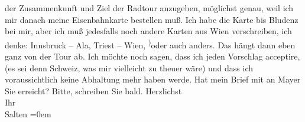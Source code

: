 \begin{ledgroupsized}[t]{13cm}
               der Zusammenkunft und Ziel der Radtour anzugeben, möglichst genau, weil ich mir
               danach meine Eisenbahnkarte bestellen muß. Ich habe die Karte bis Bludenz bei mir, aber ich muß jedesfalls noch andere Karten
               aus Wien verschreiben, ich denke: \strikeout{(}Innsbruck – Ala, Triest – Wien, \substVorne{}\textsuperscript{)}\substDazwischen{}o\substHinten{}der auch anders. Das hängt dann eben ganz von der Tour ab. {\pb}Ich möchte noch sagen, dass ich
               jeden Vorschlag acceptire, (es sei denn Schweiz, was mir vielleicht zu theuer wäre) und dass ich voraussichtlich keine
               Abhaltung mehr haben werde.\pend
           \pstart
           Hat mein Brief mit
               \label{K_L03310-2v}\label{K_L03310-2h} an Mayer Sie erreicht?\pend
           \pstart
           Bitte, schreiben Sie bald.\pend
           \pstart
           Herzlichst {\\[\baselineskip]}Ihr {\\[\baselineskip]}\spacefill\mbox{Salten}\pend
           \leftskip=0em{}
         
         \endnumbering{}\end{ledgroupsized}  \newcommand{\dateiname}{L03310}\newcommand{\titel}{Felix Salten an Arthur Schnitzler, 14. 8. 1900}\newcommand{\editorInnen}{Martin Anton Müller und Laura Untner}
      